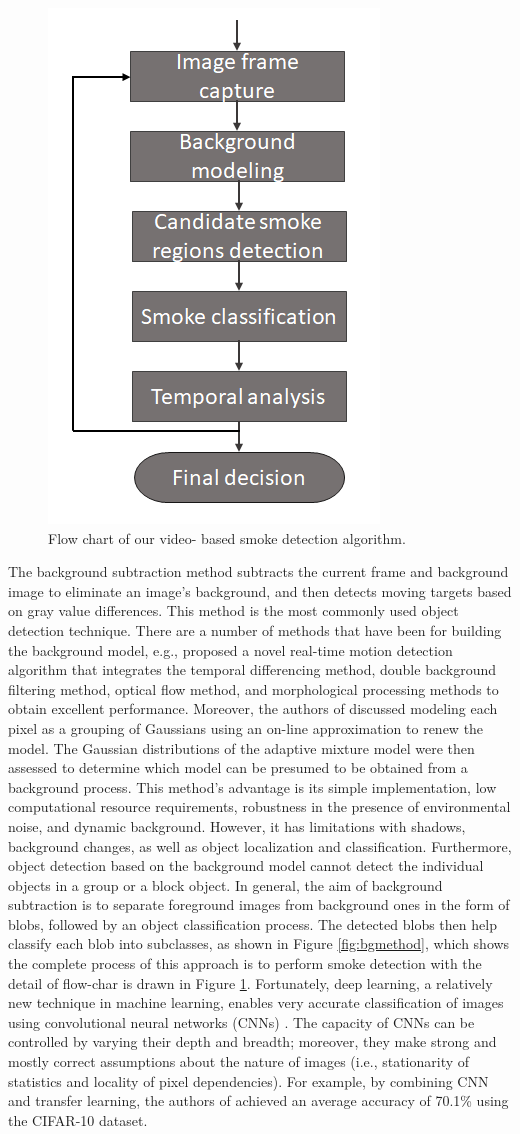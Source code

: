 \begin{figure}
\centering
 \includegraphics[width=0.3\linewidth]{Figures/smoke.jpg}
 \caption{Flow chart of our video- based smoke detection algorithm.}
 \label{fig:smoke}
\end{figure}
The background subtraction method \cite{lee2012adaptive}\cite{stauffer1999adaptive} subtracts the current frame and background image to eliminate an image’s background, and then detects moving targets based on gray value differences. This method is the most commonly used object detection technique. There are a number of methods that have been for building the background model, e.g.,  \cite{lu2008improved} proposed a novel real-time motion detection algorithm that integrates the temporal differencing method, double background filtering method, optical flow method, and morphological processing methods to obtain excellent performance. Moreover, the authors of \cite{stauffer1999adaptive} discussed modeling each pixel as a grouping of Gaussians using an on-line approximation to renew the model. The Gaussian distributions of the adaptive mixture model were then assessed to determine which model can be presumed to be obtained from a background process. This method’s advantage is its simple implementation, low computational resource requirements, robustness in the presence of environmental noise, and dynamic background. However, it has limitations with shadows, background changes, as well as object localization and classification. Furthermore, object detection based on the background model cannot detect the individual objects in a group or a block object. In general, the aim of background subtraction is to separate foreground images from background ones in the form of blobs, followed by an object classification process. The detected blobs then help classify each blob into subclasses, as shown in Figure \ref{fig:bgmethod}, which shows the complete process of this approach is to perform smoke detection with the detail of flow-char is drawn in Figure \ref{fig:smoke}. Fortunately, deep learning, a relatively new technique in machine learning, enables very accurate classification of images using convolutional neural networks (CNNs) \cite{lecun2010convolutional}\cite{jarrett2009best}\cite{lee2009convolutional}. The capacity of CNNs can be controlled by varying their depth and breadth; moreover, they make strong and mostly correct assumptions about the nature of images (i.e., stationarity of statistics and locality of pixel dependencies). For example, by combining CNN and transfer learning, the authors of \cite{hussain2018study} achieved an average accuracy of 70.1\% using the CIFAR-10  \cite{krizhevsky2009learning} dataset.

